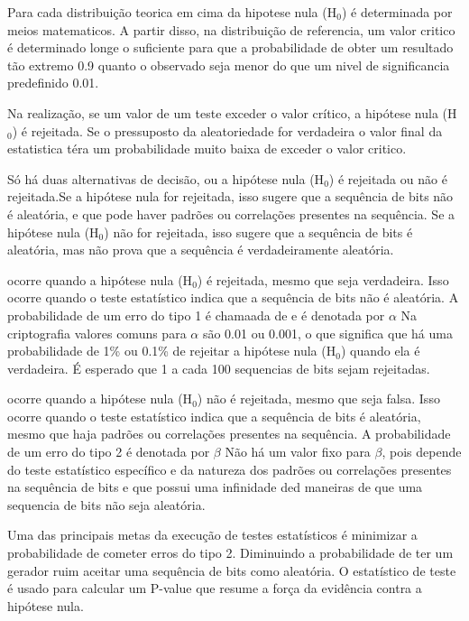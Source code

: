         Para cada distribuição teorica em cima da hipotese nula (H$_0$) é determinada por meios matematicos. A partir disso, na distribuição de referencia, 
        um valor critico é determinado longe o suficiente para que a probabilidade de obter um resultado tão extremo 0.9 quanto o observado seja menor do que um nivel de significancia predefinido 0.01.

        Na realização, se um valor de um teste exceder o valor crítico, a hipótese nula (H$_0$) é rejeitada. Se o pressuposto da aleatoriedade for verdadeira o valor final da estatistica téra um probabilidade muito baixa de exceder o valor critico.

        Só há duas alternativas de decisão, ou a hipótese nula (H$_0$) é rejeitada ou não é rejeitada.\@ Se a hipótese nula for rejeitada, isso sugere que a sequência de bits não é aleatória, e que pode haver padrões ou correlações presentes na sequência. 
        Se a hipótese nula (H$_0$) não for rejeitada, isso sugere que a sequência de bits é aleatória, mas não prova que a sequência é verdadeiramente aleatória.

         ocorre quando a hipótese nula (H$_0$) é rejeitada, mesmo que seja verdadeira. Isso ocorre quando o teste estatístico indica que a sequência de bits não é aleatória. A probabilidade de um erro do tipo 1 é chamaada de  e é denotada por $\alpha$ %
        Na criptografia valores comuns para $\alpha$ são 0.01 ou 0.001, o que significa que há uma probabilidade de 1\% ou 0.1\% de rejeitar a hipótese nula (H$_0$) quando ela é verdadeira. É esperado que 1 a cada 100 sequencias de bits sejam rejeitadas.

         ocorre quando a hipótese nula (H$_0$) não é rejeitada, mesmo que seja falsa. Isso ocorre quando o teste estatístico indica que a sequência de bits é aleatória, mesmo que haja padrões ou correlações presentes na sequência. A probabilidade de um erro do tipo 2 é denotada por $\beta$ %
        Não há um valor fixo para $\beta$, pois depende do teste estatístico específico e da natureza dos padrões ou correlações presentes na sequência de bits e que possui uma infinidade ded maneiras de que uma sequencia de bits não seja aleatória.
    
        Uma das principais metas da execução de testes estatísticos é minimizar a probabilidade de cometer erros do tipo 2. Diminuindo a probabilidade de ter um gerador ruim aceitar uma sequência de bits como aleatória.
        O estatístico de teste é usado para calcular um P-value que resume a força da evidência contra a hipótese nula.
        

